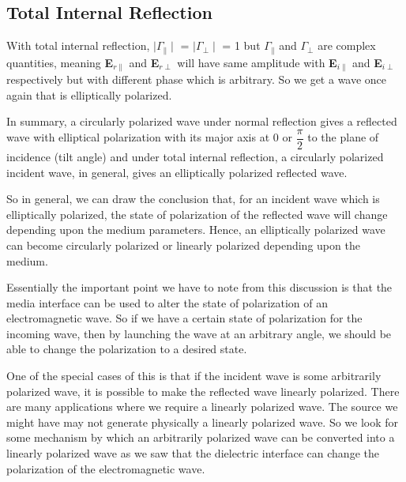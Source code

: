 \subsection{Total Internal Reflection}
With total internal reflection, $\mid\Gamma_\parallel\mid$ = $\mid\Gamma_\perp\mid$ = 1 but $\Gamma_\parallel$ and $\Gamma_\perp$ are complex quantities, meaning
\textbf{E}$_{r\parallel}$ and \textbf{E}$_{r\perp}$ will have same amplitude with \textbf{E}$_{i\parallel}$ and \textbf{E}$_{i\perp}$ respectively but with different phase which is arbitrary. So we get a wave once again that is elliptically polarized.

In summary, a circularly polarized wave under normal reflection gives a reflected wave with elliptical polarization with its major axis at 0 or $\dfrac{\pi}{2}$ to the plane of incidence (tilt angle) and under total internal reflection, a circularly polarized incident wave, in general, gives an elliptically polarized reflected wave.

So in general, we can draw the conclusion that, for an incident wave which is elliptically polarized, the state of polarization of the reflected wave will change depending upon the medium parameters. Hence, an elliptically polarized wave can become circularly polarized or linearly polarized depending upon the medium.

Essentially the important point we have to note from this discussion is that the media interface can be used to alter the state of polarization of an electromagnetic wave. So if we have a certain state of polarization for the incoming wave, then by launching the wave at an arbitrary angle, we should be able to change the polarization to a desired state.

One of the special cases of this is that if the incident wave is some arbitrarily polarized wave, it is possible to make the reflected wave linearly polarized. There are many applications where we require a linearly polarized wave. The source we might have may not generate physically a linearly polarized wave.  So we look for some mechanism by which an arbitrarily polarized wave can be converted into a linearly polarized wave as we saw that the dielectric interface can change the polarization of the electromagnetic wave.


